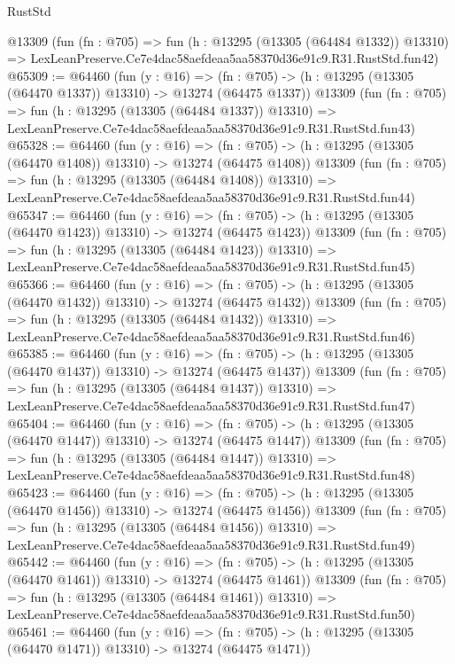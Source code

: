 \begin{lexlean}{RustStd}
\begin{coremodule}
    @13309
    (fun (fn : @705) =>
    fun (h : @13295 (@13305 (@64484 @1332)) @13310) =>
    LexLeanPreserve.Ce7e4dac58aefdeaa5aa58370d36e91c9.R31.RustStd.fun42)
@65309 := @64460
    (fun (y : @16) =>
    (fn : @705) -> (h : @13295 (@13305 (@64470 @1337)) @13310) -> @13274 (@64475 @1337))
    @13309
    (fun (fn : @705) =>
    fun (h : @13295 (@13305 (@64484 @1337)) @13310) =>
    LexLeanPreserve.Ce7e4dac58aefdeaa5aa58370d36e91c9.R31.RustStd.fun43)
@65328 := @64460
    (fun (y : @16) =>
    (fn : @705) -> (h : @13295 (@13305 (@64470 @1408)) @13310) -> @13274 (@64475 @1408))
    @13309
    (fun (fn : @705) =>
    fun (h : @13295 (@13305 (@64484 @1408)) @13310) =>
    LexLeanPreserve.Ce7e4dac58aefdeaa5aa58370d36e91c9.R31.RustStd.fun44)
@65347 := @64460
    (fun (y : @16) =>
    (fn : @705) -> (h : @13295 (@13305 (@64470 @1423)) @13310) -> @13274 (@64475 @1423))
    @13309
    (fun (fn : @705) =>
    fun (h : @13295 (@13305 (@64484 @1423)) @13310) =>
    LexLeanPreserve.Ce7e4dac58aefdeaa5aa58370d36e91c9.R31.RustStd.fun45)
@65366 := @64460
    (fun (y : @16) =>
    (fn : @705) -> (h : @13295 (@13305 (@64470 @1432)) @13310) -> @13274 (@64475 @1432))
    @13309
    (fun (fn : @705) =>
    fun (h : @13295 (@13305 (@64484 @1432)) @13310) =>
    LexLeanPreserve.Ce7e4dac58aefdeaa5aa58370d36e91c9.R31.RustStd.fun46)
@65385 := @64460
    (fun (y : @16) =>
    (fn : @705) -> (h : @13295 (@13305 (@64470 @1437)) @13310) -> @13274 (@64475 @1437))
    @13309
    (fun (fn : @705) =>
    fun (h : @13295 (@13305 (@64484 @1437)) @13310) =>
    LexLeanPreserve.Ce7e4dac58aefdeaa5aa58370d36e91c9.R31.RustStd.fun47)
@65404 := @64460
    (fun (y : @16) =>
    (fn : @705) -> (h : @13295 (@13305 (@64470 @1447)) @13310) -> @13274 (@64475 @1447))
    @13309
    (fun (fn : @705) =>
    fun (h : @13295 (@13305 (@64484 @1447)) @13310) =>
    LexLeanPreserve.Ce7e4dac58aefdeaa5aa58370d36e91c9.R31.RustStd.fun48)
@65423 := @64460
    (fun (y : @16) =>
    (fn : @705) -> (h : @13295 (@13305 (@64470 @1456)) @13310) -> @13274 (@64475 @1456))
    @13309
    (fun (fn : @705) =>
    fun (h : @13295 (@13305 (@64484 @1456)) @13310) =>
    LexLeanPreserve.Ce7e4dac58aefdeaa5aa58370d36e91c9.R31.RustStd.fun49)
@65442 := @64460
    (fun (y : @16) =>
    (fn : @705) -> (h : @13295 (@13305 (@64470 @1461)) @13310) -> @13274 (@64475 @1461))
    @13309
    (fun (fn : @705) =>
    fun (h : @13295 (@13305 (@64484 @1461)) @13310) =>
    LexLeanPreserve.Ce7e4dac58aefdeaa5aa58370d36e91c9.R31.RustStd.fun50)
@65461 := @64460
    (fun (y : @16) =>
    (fn : @705) -> (h : @13295 (@13305 (@64470 @1471)) @13310) -> @13274 (@64475 @1471))

\end{coremodule}
\end{lexlean}
